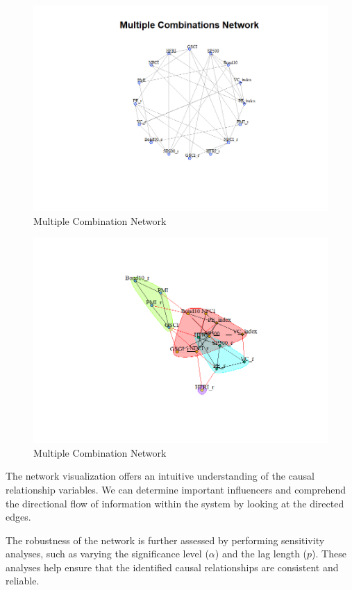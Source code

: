 \documentclass[12pt]{article}
\begin{document}
\begin{figure}[H]
    \centering
    \includegraphics[width=1\linewidth]{Rplot25.png}
    \caption{Multiple Combination Network}
    \label{fig:enter-label}
\end{figure}
\begin{figure}[H]
    \centering
    \includegraphics[width=1\linewidth]{Rplot24.png}
    \caption{Multiple Combination Network}
    \label{fig:enter-label}
\end{figure}

The network visualization offers an intuitive understanding of the causal relationship variables. We can determine important influencers and comprehend the directional flow of information within the system by looking at the directed edges.

The robustness of the network is further assessed by performing sensitivity analyses, such as varying the significance level (\(\alpha\)) and the lag length (\(p\)). These analyses help ensure that the identified causal relationships are consistent and reliable.
\end{document}
